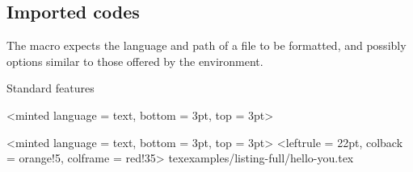 \documentclass{tutodoc}
\begin{document}
\subsection{Imported codes}

The  macro expects the language and path of a file to be formatted, and possibly options similar to those offered by the  environment.


\begin{tdocexa}{Standard features}
	\leavevmode

    \begin{tdoclatex}<minted language = text, bottom = 3pt, top = 3pt>
    \end{tdoclatex}
\end{tdocexa}


\begin{tdocexa}
	\leavevmode

    \begin{tdoclatex}<minted language = text, bottom = 3pt, top = 3pt>
\tdoccodeinput[style = solarized-light, linenos]%
              <leftrule = 22pt, colback = orange!5, colframe = red!35>%
              {tex}{examples/listing-full/hello-you.tex}
    \end{tdoclatex}
\end{tdocexa}
\end{document}
